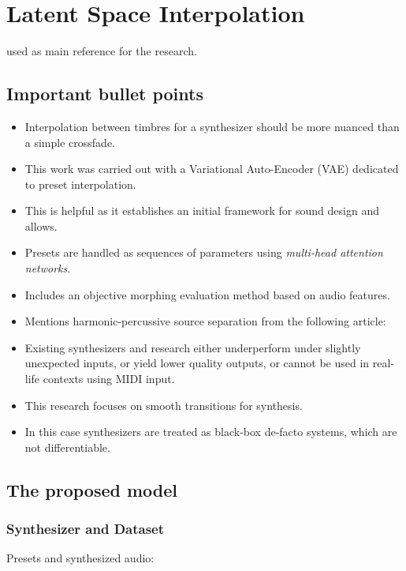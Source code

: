 \section{Latent Space Interpolation}

\cite{latentSpaceInterpolation} used as main reference for the research.

\subsection{Important bullet points}

\begin{itemize}
    \item Interpolation between timbres for a synthesizer should be more nuanced than a simple crossfade.
    \item This work was carried out with a Variational Auto-Encoder (VAE) dedicated to preset interpolation.
    \item This is helpful as it establishes an initial framework for sound design and allows.
    \item Presets are handled as sequences of parameters using \textit{multi-head attention networks}.
    \item Includes an objective morphing evaluation method based on audio features.
    \item Mentions harmonic-percussive source separation from the following article: \cite{Harmonic_Percussive_Separation}
    \item Existing synthesizers and research either underperform under slightly unexpected inputs, or yield lower quality outputs, or cannot be used in real-life contexts using MIDI input.
    \item This research focuses on smooth transitions for synthesis.
    \item In this case synthesizers are treated as black-box de-facto systems, which are not differentiable.
\end{itemize}

\subsection{The proposed model}

\subsubsection{Synthesizer and Dataset}

Presets and synthesized audio:

